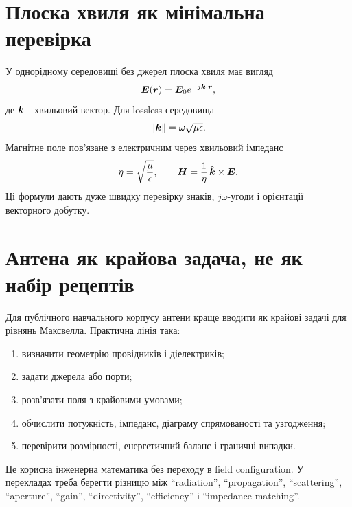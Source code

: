 \section{Плоска хвиля як мінімальна перевірка}

У однорідному середовищі без джерел плоска хвиля має вигляд
\begin{equation}
  \bm{E}(\bm{r}) = \bm{E}_0 e^{-j\bm{k}\cdot\bm{r}},
\end{equation}
де $\bm{k}$ - хвильовий вектор. Для lossless середовища
\begin{equation}
  \lVert \bm{k}\rVert = \omega\sqrt{\mu\epsilon}.
\end{equation}
Магнітне поле пов'язане з електричним через хвильовий імпеданс
\begin{equation}
  \eta = \sqrt{\frac{\mu}{\epsilon}}, \qquad
  \bm{H} = \frac{1}{\eta}\,\hat{\bm{k}}\times\bm{E}.
\end{equation}
Ці формули дають дуже швидку перевірку знаків, $j\omega$-угоди і орієнтації векторного добутку.

\section{Антена як крайова задача, не як набір рецептів}

Для публічного навчального корпусу антени краще вводити як крайові задачі для рівнянь Максвелла. Практична лінія така:
\begin{enumerate}[label=\arabic*.]
\item визначити геометрію провідників і діелектриків;
\item задати джерела або порти;
\item розв'язати поля з крайовими умовами;
\item обчислити потужність, імпеданс, діаграму спрямованості та узгодження;
\item перевірити розмірності, енергетичний баланс і граничні випадки.
\end{enumerate}

Це корисна інженерна математика без переходу в field configuration. У перекладах треба берегти різницю між ``radiation'', ``propagation'', ``scattering'', ``aperture'', ``gain'', ``directivity'', ``efficiency'' і ``impedance matching''.


